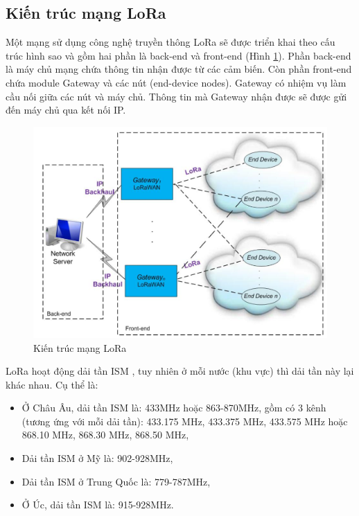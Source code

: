 \subsection{Kiến trúc mạng LoRa}
Một mạng sử dụng công nghệ truyền thông LoRa \cite{4} sẽ được triển khai theo cấu trúc hình sao và gồm hai phần là back-end và front-end (Hình \ref{refhinh2_2}). Phần back-end là máy chủ mạng chứa thông tin nhận được từ các cảm biến. Còn phần front-end chứa module Gateway và các nút (end-device nodes). Gateway có nhiệm vụ làm cầu nối giữa các nút và máy chủ. Thông tin mà Gateway nhận được sẽ được gửi đến máy chủ qua kết nối IP.
\begin{center}
    \begin{figure}[h]
    \begin{center}
     \includegraphics[scale=0.22]{image/hinh2_2}
    \end{center}
    \caption{Kiến trúc mạng LoRa \cite{4}}
    \label{refhinh2_2}
    \end{figure}
\end{center}
\par 
LoRa hoạt động dải tần ISM \cite{4}, tuy nhiên ở mỗi nước (khu vực) thì dải tần này lại khác nhau. Cụ thể là:
\begin{itemize}
\item	Ở Châu Âu, dải tần ISM là: 433MHz hoặc 863-870MHz, gồm có 3 kênh (tương ứng với mỗi dải tần): 433.175 MHz, 433.375 MHz, 433.575 MHz hoặc 868.10 MHz, 868.30 MHz, 868.50 MHz,
\item	Dải tần ISM ở Mỹ là: 902-928MHz,
\item 	Dải tần ISM ở Trung Quốc là: 779-787MHz,
\item 	Ở Úc, dải tần ISM là: 915-928MHz.
\end{itemize}
